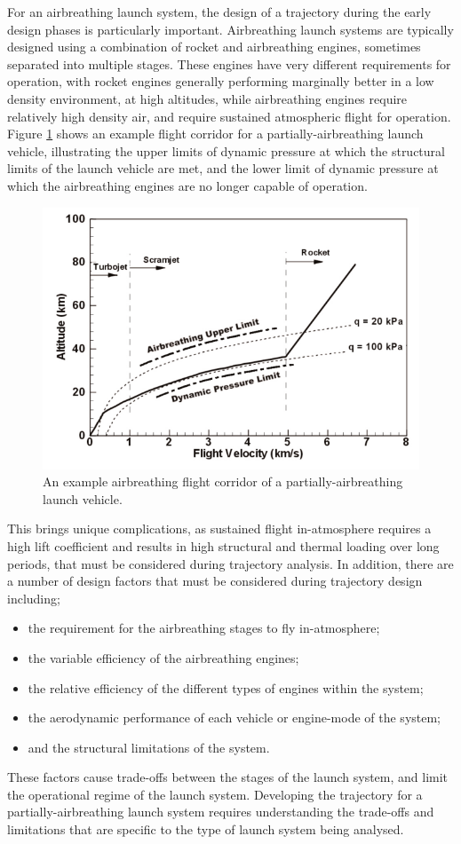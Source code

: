 For an airbreathing launch system, the design of a trajectory during the early design phases is particularly important. Airbreathing launch systems are typically designed using a combination of rocket and airbreathing engines, sometimes separated into multiple stages. These engines have very different requirements for operation, with rocket engines generally performing marginally better in a low density environment, at high altitudes, while airbreathing engines require relatively high density air, and require sustained atmospheric flight for operation. Figure \ref{fig:FlightCorridor} shows an example flight corridor for a partially-airbreathing launch vehicle, illustrating the upper limits of dynamic pressure at which the structural limits of the launch vehicle are met, and the lower limit of dynamic pressure at which the airbreathing engines are no longer capable of operation. 
\begin{figure}[ht]
\centering
\includegraphics[width=0.7\linewidth]{figures/2_literature-review/FlightCorridor}
\caption{An example airbreathing flight corridor of a partially-airbreathing launch vehicle.}
\label{fig:FlightCorridor}
\end{figure}
This brings unique complications, as sustained flight in-atmosphere requires a high lift coefficient and results in high structural and thermal loading over long periods, that must be considered during trajectory analysis. In addition, there are a number of design factors that must be considered during trajectory design including;
\begin{itemize}
	\item the requirement for the airbreathing stages to fly in-atmosphere;
	\item the variable efficiency of the airbreathing engines;
	\item the relative efficiency of the different types of engines within the system;
	\item the aerodynamic performance of each vehicle or engine-mode of the system;
	\item and the structural limitations of the system.
\end{itemize}
These factors cause trade-offs between the stages of the launch system, and limit the operational regime of the launch system.
 Developing the trajectory for a partially-airbreathing launch system requires understanding the trade-offs and limitations that are specific to the type of launch system being analysed.


